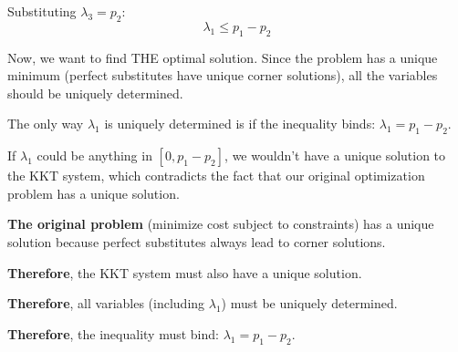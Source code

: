 \documentclass[11pt]{article}
\begin{document}
Substituting $\lambda_3 = p_2$:
$$\lambda_1 \leq p_1 - p_2$$

Now, we want to find THE optimal solution. Since the problem has a unique minimum (perfect substitutes have unique corner solutions), all the variables should be uniquely determined.

The only way $\lambda_1$ is uniquely determined is if the inequality binds: $\lambda_1 = p_1 - p_2$.

If $\lambda_1$ could be anything in $[0, p_1 - p_2]$, we wouldn't have a unique solution to the KKT system, which contradicts the fact that our original optimization problem has a unique solution.

\begin{tcolorbox}[colback=green!5!white,colframe=green!75!black,title=Uniqueness Argument]
\textbf{The original problem} (minimize cost subject to constraints) has a unique solution because perfect substitutes always lead to corner solutions.

\textbf{Therefore}, the KKT system must also have a unique solution.

\textbf{Therefore}, all variables (including $\lambda_1$) must be uniquely determined.

\textbf{Therefore}, the inequality must bind: $\lambda_1 = p_1 - p_2$.
\end{tcolorbox}
\end{document}
